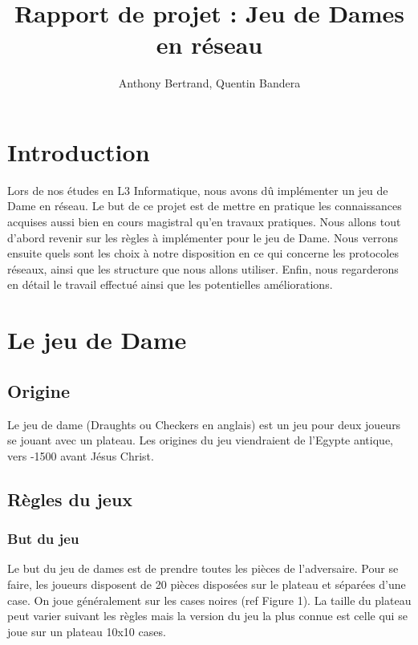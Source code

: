 \documentclass{article}
\title{Rapport de projet : Jeu de Dames en réseau}
\author{Anthony Bertrand, Quentin Bandera}
\date{}
\begin{document}
    \maketitle
    \tableofcontents
    \newpage
    \section{Introduction}
        Lors de nos études en L3 Informatique, nous avons dû implémenter un jeu de Dame en réseau. Le but de ce projet
        est de mettre en pratique les connaissances acquises aussi bien en cours magistral qu'en travaux pratiques.
        Nous allons tout d'abord revenir sur les règles à implémenter pour le jeu de Dame. Nous verrons ensuite quels sont
        les choix à notre disposition en ce qui concerne les protocoles réseaux, ainsi que les structure que nous allons utiliser.
        Enfin, nous regarderons en détail le travail effectué ainsi que les potentielles améliorations.

    \section{Le jeu de Dame}
    \subsection{Origine}
        Le jeu de dame (Draughts ou Checkers en anglais) est un jeu pour deux joueurs se jouant avec un plateau. Les origines du
        jeu viendraient de l'Egypte antique, vers -1500 avant Jésus Christ.

    \subsection{Règles du jeux}
    \subsubsection{But du jeu}
        Le but du jeu de dames est de prendre toutes les pièces de l'adversaire. Pour se faire, les joueurs disposent de 20 pièces
        disposées sur le plateau et séparées d'une case. On joue généralement sur les cases noires (ref Figure 1). La taille du plateau
        peut varier suivant les règles mais la version du jeu la plus connue est celle qui se joue sur un plateau 10x10 cases.
        
\end{document}
